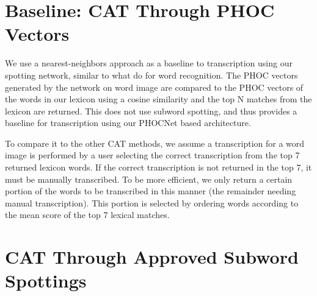 \documentclass[ms,electronic,twosidetoc,letterpaper,chaptercenter,parttop,lof,lot]{byumsphd}
\begin{document}
\section{Baseline: CAT Through PHOC Vectors}
We use a nearest-neighbors approach as a baseline to transcription using our spotting network, similar to what \cite{krishnan2016} do for word recognition. The PHOC vectors generated by the network on word image are compared to the PHOC vectors of the  words in our lexicon using a cosine similarity and the top N matches from the lexicon are returned. This does not use subword spotting, and thus provides a baseline for transcription using our PHOCNet based architecture.

To compare it to the other CAT methods, we assume a transcription for a word image is performed by a user selecting the correct transcription from the top 7 returned lexicon words. If the correct transcription is not returned in the top 7, it must be manually transcribed.
To be more efficient, we only return a certain portion of the words to be transcribed in this manner (the remainder needing manual transcription). This portion is selected by ordering words according to the mean score of the top 7 lexical matches.







\section{CAT Through Approved Subword Spottings}
\end{document}
